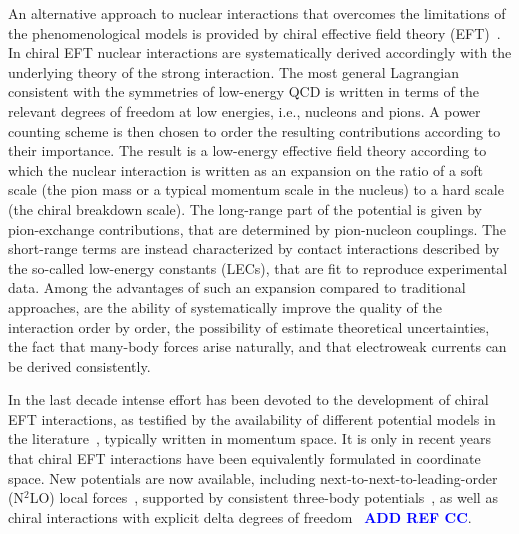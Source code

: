 \documentclass[aps,prc,twocolumn,superscriptaddress,showpacs,floatfix,nofootinbib]{revtex4-1}
\newcommand{\blue}[1]{\protect\textcolor{blue}{#1}}
\begin{document}
An alternative approach to nuclear interactions that overcomes the limitations
of the phenomenological models is provided by chiral effective field theory 
(EFT)~\cite{Epelbaum:2009,Machleidt:2011}.
In chiral EFT nuclear interactions are systematically derived accordingly with 
the underlying theory of the strong interaction. The most general 
Lagrangian consistent with the symmetries of low-energy QCD is written in terms 
of the relevant degrees of freedom at low energies, i.e., nucleons and pions.
A power counting scheme is then chosen to order the resulting contributions according 
to their importance. The result is a low-energy effective field theory according
to which the nuclear interaction is written as an expansion on the ratio of a 
soft scale (the pion mass or a typical momentum scale in the nucleus) to a
hard scale (the chiral breakdown scale). The long-range part of the potential
is given by pion-exchange contributions, that are determined by pion-nucleon 
couplings. The short-range terms are instead characterized by contact
interactions described by the so-called low-energy constants (LECs), that are fit to 
reproduce experimental data. Among the advantages of such an 
expansion compared to traditional approaches, are the ability of 
systematically improve the quality of the interaction order by order, 
the possibility of estimate theoretical uncertainties, the fact that
many-body forces arise naturally, and that electroweak currents can 
be derived consistently.

In the last decade intense effort has been devoted to the 
development of chiral EFT interactions, as testified by the 
availability of different potential models in the 
literature~\cite{Epelbaum:2009,Machleidt:2011,Ekstrom:2013,Entem:2015,
Epelbaum:2015,Ekstrom:2015,Ekstrom:2017}, typically written in momentum 
space. It is only in recent
years that chiral EFT interactions have been equivalently formulated 
in coordinate space. New potentials are now available, including 
next-to-next-to-leading-order (N$^2$LO) local 
forces~\cite{Gezerlis:2013,Gezerlis:2014}, supported by consistent
three-body potentials~\cite{Tews:2016,Lynn:2016}, as
well as chiral interactions with explicit delta degrees of
freedom~\cite{Piarulli:2015,Piarulli:2016,Piarulli:2017}
\blue{\bf ADD REF CC}.
\end{document}
